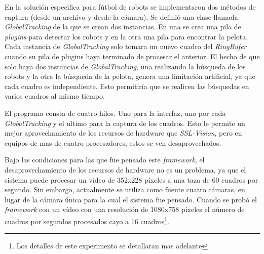 En la solución especifica para fútbol de robots se implementaron dos métodos de
captura (desde un archivo y desde la cámara). Se definió una clase llamada
\emph{GlobalTracking} de la que se crean dos instancias. En una se crea una pila
de \emph{plugins} para detectar los robots y en la otra una pila para encontrar
la pelota. Cada instancia de \emph{GlobalTracking} solo tomara un nuevo cuadro
del \emph{RingBufer} cuando su pila de plugins haya terminado de procesar el
anterior. El hecho de que solo haya dos instancias de \emph{GlobalTracking}, una
realizando la búsqueda de los robots y la otra la búsqueda de la pelota, genera
una limitación artificial, ya que cada cuadro es independiente. Esto permitiría
que se realicen las búsquedas en varios cuadros al mismo tiempo.

El programa consta de cuatro hilos. Uno para la interfaz, uno por cada
\emph{GlobalTracking} y el ultimo para la captura de los cuadros. Esto le
permite un mejor aprovechamiento de los recursos de hardware que
\emph{SSL-Vision}, pero en equipos de mas de cuatro procesadores, estos se ven
desaprovechados.

Bajo las condiciones para las que fue pensado este \emph{framework}, el
desaprovechamiento de los recursos de hardware no es un problema, ya que el
sistema puede procesar un vídeo de 352x228 píxeles a una taza de 60 cuadros por
segundo. Sin embargo, actualmente se utiliza como fuente cuatro cámaras, en
lugar de la cámara única para la cual el sistema fue pensado. Cuando se probó el
\emph{framework} con un vídeo con una resolución de 1080x758 píxeles el número
de cuadros por segundos procesados cayo a 16 cuadros\footnote{Los detalles de
este experimento se detallaran mas adelante}.

